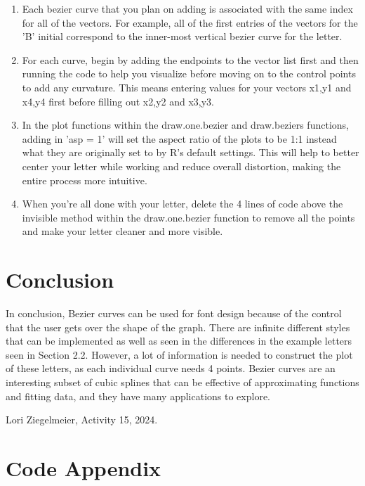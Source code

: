 \documentclass{article}
\begin{document}
\begin{enumerate}
    \item Each bezier curve that you plan on adding is associated with the same index for all of the vectors. For example, all of the first entries of the vectors for the 'B' initial correspond to the inner-most vertical bezier curve for the letter.
    \item For each curve, begin by adding the endpoints to the vector list first and then running the code to help you visualize before moving on to the control points to add any curvature. This means entering values for your vectors x1,y1 and x4,y4 first before filling out x2,y2 and x3,y3.
    \item In the plot functions within the draw.one.bezier and draw.beziers functions, adding in 'asp = 1' will set the aspect ratio of the plots to be 1:1 instead what they are originally set to by R's default settings. This will help to better center your letter while working and reduce overall distortion, making the entire process more intuitive.
    \item When you're all done with your letter, delete the 4 lines of code above the invisible method within the draw.one.bezier function to remove all the points and make your letter cleaner and more visible.
\end{enumerate}

\section{Conclusion}

In conclusion, Bezier curves can be used for font design because of the control that the user gets over the shape of the graph. There are infinite different styles that can be implemented as well as seen in the differences in the example letters seen in Section 2.2. However, a lot of information is needed to construct the plot of these letters, as each individual curve needs 4 points. Bezier curves are an interesting subset of cubic splines that can be effective of approximating functions and fitting data, and they have many applications to explore.




  Lori Ziegelmeier,
  Activity 15,
  2024.

\vspace{2in}

\newpage

\section{Code Appendix}
\end{document}
